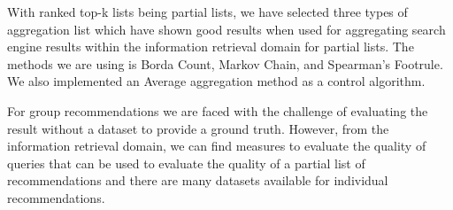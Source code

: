 With ranked top-k lists being partial lists, we have selected three types of aggregation list which have shown good results when used for aggregating search engine results within the information retrieval domain for partial lists. The methods we are using is Borda Count, Markov Chain, and Spearman's Footrule\cite{Masthoff2004, rank:aggregation}. We also implemented an Average aggregation method as a control algorithm\cite{Masthoff2004}.

For group recommendations we are faced with the challenge of evaluating the result without a dataset to provide a ground truth. However, from the information retrieval domain, we can find measures to evaluate the quality of queries that can be used to evaluate the quality of a partial list of recommendations and there are many datasets available for individual recommendations.







